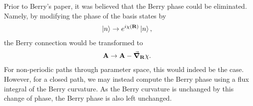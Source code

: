 Prior to Berry's paper, it was believed that the Berry phase could be eliminated. Namely, by modifying the phase of the basis states by
\begin{align*}
	\ket{n}\to e^{i\chi(\vb{R})}\ket{n},
\end{align*}
the Berry connection would be transformed to
\begin{align*}
	\vb{A}\to \vb{A} - \grad_{\vb{R}}{\chi}.
\end{align*}
For non-periodic paths through parameter space, this would indeed be the case. However, for a closed path, we may instead compute the Berry phase using a flux integral of the Berry curvature. As the Berry curvature is unchanged by this change of phase, the Berry phase is also left unchanged.